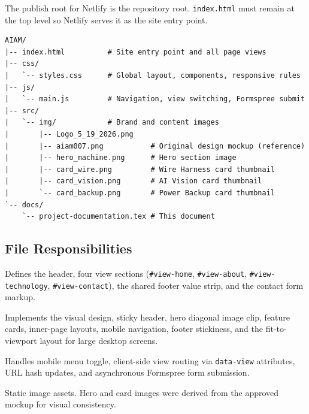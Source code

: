 \documentclass[11pt,a4paper]{article}
\begin{document}
The publish root for Netlify is the repository root. \texttt{index.html} must
remain at the top level so Netlify serves it as the site entry point.

\begin{lstlisting}
AIAM/
|-- index.html          # Site entry point and all page views
|-- css/
|   `-- styles.css      # Global layout, components, responsive rules
|-- js/
|   `-- main.js         # Navigation, view switching, Formspree submit
|-- src/
|   `-- img/            # Brand and content images
|       |-- Logo_5_19_2026.png
|       |-- aiam007.png           # Original design mockup (reference)
|       |-- hero_machine.png      # Hero section image
|       |-- card_wire.png         # Wire Harness card thumbnail
|       |-- card_vision.png       # AI Vision card thumbnail
|       `-- card_backup.png       # Power Backup card thumbnail
`-- docs/
    `-- project-documentation.tex # This document
\end{lstlisting}

\subsection{File Responsibilities}

\begin{description}[style=nextline]
  \item[\texttt{index.html}]
    Defines the header, four view sections (\texttt{\#view-home},
    \texttt{\#view-about}, \texttt{\#view-technology}, \texttt{\#view-contact}),
    the shared footer value strip, and the contact form markup.

  \item[\texttt{css/styles.css}]
    Implements the visual design, sticky header, hero diagonal image clip,
    feature cards, inner-page layouts, mobile navigation, footer stickiness,
    and the fit-to-viewport layout for large desktop screens.

  \item[\texttt{js/main.js}]
    Handles mobile menu toggle, client-side view routing via \texttt{data-view}
    attributes, URL hash updates, and asynchronous Formspree form submission.

  \item[\texttt{src/img/}]
    Static image assets. Hero and card images were derived from the approved
    mockup for visual consistency.
\end{description}

\end{document}
